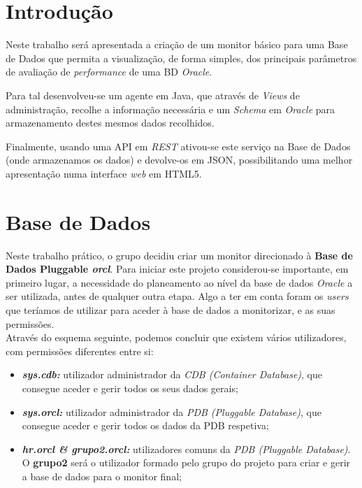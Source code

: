 \documentclass[a4paper]{article}
\begin{document}
\pagebreak
\tableofcontents
\newpage

\section{Introdução}
\hspace{3mm} 

Neste trabalho será apresentada a criação de um monitor básico para uma Base de Dados que permita a visualização, de forma simples, dos principais parâmetros de avaliação de \emph{performance} de uma BD \emph{Oracle}.

Para tal desenvolveu-se um agente em Java, que através de \emph{Views} de administração, recolhe a informação necessária e um \emph{Schema} em \emph{Oracle} para armazenamento destes mesmos dados recolhidos.

Finalmente, usando uma API em \emph{REST} ativou-se este serviço na Base de Dados (onde armazenamos os dados) e devolve-os em JSON, possibilitando uma melhor apresentação numa interface \emph{web} em HTML5.

\newpage


\section{Base de Dados}
\hspace{3mm} 

Neste trabalho prático, o grupo decidiu criar um monitor direcionado à \textbf{Base de Dados Pluggable \emph{orcl}}.
Para iniciar este projeto considerou-se importante, em primeiro lugar, a necessidade do planeamento ao nível da base de dados \emph{Oracle} a ser utilizada, antes de qualquer outra etapa. Algo a ter em conta foram os \emph{users} que teríamos de utilizar para aceder à base de dados a monitorizar, e as suas permissões. \\

Através do esquema seguinte, podemos concluir que existem vários utilizadores, com permissões diferentes entre si:

\begin{itemize}
    \item \textit{\textbf{sys.cdb:}} utilizador administrador da \emph{CDB (Container Database)}, que consegue aceder e gerir todos os seus dados gerais; 
    
    \item \textit{\textbf{sys.orcl:}} utilizador administrador da \emph{PDB (Pluggable Database)}, que consegue aceder e gerir todos os dados da PDB respetiva; 
    
    \item \textit{\textbf{hr.orcl \& grupo2.orcl:}} utilizadores comuns da \emph{PDB (Pluggable Database)}. O \textbf{grupo2} será o utilizador formado pelo grupo do projeto para criar e gerir a base de dados para o monitor final; 
\end{itemize}
\end{document}
